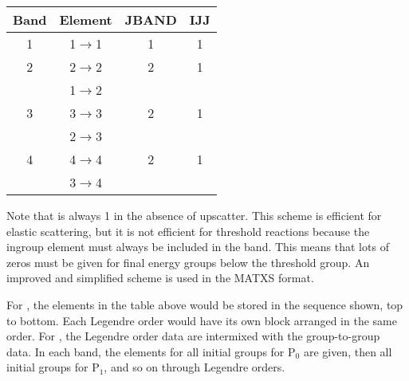 \begin{center}
\begin{tabular}{cccc}
Band & Element & JBAND & IJJ \\ \hline
1    & 1$\rightarrow$1 & 1 & 1 \\
2    & 2$\rightarrow$2 & 2 & 1 \\
     & 1$\rightarrow$2 &   &   \\
3    & 3$\rightarrow$3 & 2 & 1 \\
     & 2$\rightarrow$3 &   &   \\
4    & 4$\rightarrow$4 & 2 & 1 \\
     & 3$\rightarrow$4 &   &   \\ \hline
\end{tabular}
\end{center}

Note that  is always 1 in the absence of upscatter.  This
scheme is efficient for elastic scattering, but it is not efficient
for threshold reactions because the ingroup element must always be
included in the band.  This means that lots of zeros must be given
for final energy groups below the threshold group.  An improved
and simplified scheme is used in the MATXS format.

For , the elements in the table above would be stored
in the sequence shown, top to bottom.  Each Legendre order would
have its own block arranged in the same order.  For ,
the Legendre order data are intermixed with the group-to-group
data.  In each band, the elements for all initial groups for
P$_0$ are given, then all initial groups for P$_1$, and so on
through  Legendre orders.

